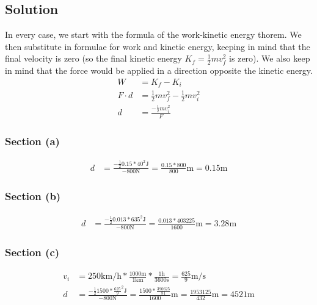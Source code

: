 \documentclass[12pt]{article}
\begin{document}
\subsection*{Solution}
In every case, we start with the formula of the work-kinetic energy thorem. We then substitute in formulae for work and kinetic energy, keeping in mind that the final velocity is zero (so the final kinetic energy $K_f = \frac{1}{2}mv_f^2$ is zero). We also keep in mind that the force would be applied in a direction opposite the kinetic energy.
\begin{align*}
    W   &= K_f - K_i\\
    F \cdot d   &= \frac{1}{2}mv_f^2 - \frac{1}{2}mv_i^2\\
    d   &= \frac{-\frac{1}{2}mv_i^2}{F}
\end{align*}

\subsubsection*{Section (a)}
\begin{align*}
    d   &= \frac{-\frac{1}{2}0.15*40^2 \unit{\joule}}{-800 \unit{\newton}}
        = \frac{0.15 * 800}{800} \unit{\meter} 
        = \boxed{0.15 \unit{\meter}}
\end{align*}

\subsubsection*{Section (b)}
\begin{align*}
    d   &= \frac{-\frac{1}{2}0.013*635^2 \unit{\joule}}{-800 \unit{\newton}}
        = \frac{0.013 * 403225}{1600} \unit{\meter} 
        = \boxed{3.28 \unit{\meter}}
\end{align*}

\subsubsection*{Section (c)}
\begin{align*}
    v_i &= 250 \unit{\kilo\meter/\hour} * \frac{1000 \unit{\meter}}{1 \unit{\kilo\meter}} * \frac{1 \unit{\hour}}{3600 \unit{\second}} = \frac{625}{9} \unit{\meter/\second}\\
    d   &= \frac{-\frac{1}{2}1500*\frac{625}{9}^2 \unit{\joule}}{-800 \unit{\newton}}
        = \frac{1500*\frac{390625}{81}}{1600} \unit{\meter} 
        = \boxed{\frac{1953125}{432} \unit{\meter} = 4521 \unit{\meter}}
\end{align*}
\end{document}
